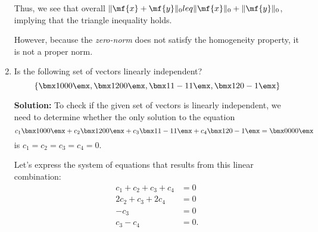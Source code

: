 \begin{enumerate}
\begin{boxedstuff}
        Thus, we see that overall $\Vert \mf{x} + \mf{y} \Vert_0 
        leq \Vert \mf{x} \Vert_0 + \Vert \mf{y} \Vert_0$, implying that the triangle inequality holds.
        
        However, because the \textit{zero-norm} does not satisfy the homogeneity property, it is not a proper norm.
    \end{boxedstuff}

    \item Is the following set of vectors linearly independent?
    \[ \left\{ \bmx 1 \\ 0 \\ 0 \\ 0 \emx, \bmx 1 \\ 2 \\ 0 \\ 0 \emx , \bmx 1 \\ 1 \\ -1 \\ 1 \emx , \bmx 1 \\ 2 \\ 0 \\ -1 \emx  \right\} \]
    
    \begin{boxedstuff}
        \vspace{4mm}
        \textbf{Solution:} To check if the given set of vectors is linearly independent, we need to determine whether the only solution to the equation
        \[
        c_1 \bmx 1 \\ 0 \\ 0 \\ 0 \emx + c_2 \bmx 1 \\ 2 \\ 0 \\ 0 \emx + c_3 \bmx 1 \\ 1 \\ -1 \\ 1 \emx + c_4 \bmx 1 \\ 2 \\ 0 \\ -1 \emx = \bmx 0 \\ 0 \\ 0 \\ 0 \emx
        \]
        is $c_1 = c_2 = c_3 = c_4 = 0$.

        Let's express the system of equations that results from this linear combination:
        \[
        \begin{aligned}
            c_1 + c_2 + c_3 + c_4 &= 0 \\
            2c_2 + c_3 + 2c_4 &= 0 \\
            -c_3 &= 0 \\
            c_3 - c_4 &= 0.
        \end{aligned}
        \]


\end{boxedstuff}
\end{enumerate}
